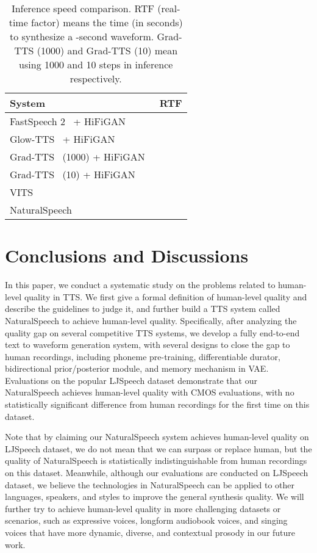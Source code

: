 \documentclass{article}
\theoremstyle{definition}
\def\myname{NaturalSpeech}
\begin{document}
\begin{table}[h!]
	\caption{Inference speed comparison. RTF (real-time factor) means the time (in seconds) to synthesize a -second waveform.  Grad-TTS (1000) and  Grad-TTS (10) mean using 1000 and 10 steps in inference respectively.}
	\centering
	\begin{tabular}{ l c}
		\toprule
	    System & RTF \\
	    \midrule
	    FastSpeech 2~\citep{ren2021fastspeech} + HiFiGAN~\citep{kong2020hifi}  &  \\
	    Glow-TTS~\citep{kim2020glow} + HiFiGAN~\citep{kong2020hifi} & \\
	    Grad-TTS~\citep{popov2021grad} (1000) + HiFiGAN~\citep{kong2020hifi} & \\
	    Grad-TTS~\citep{popov2021grad} (10) + HiFiGAN~\citep{kong2020hifi} & \\
	    VITS~\citep{kim2021conditional} & \\
	    \midrule
		\myname{}  &  \\
		\bottomrule
	\end{tabular}
	\label{tab_exp_latency}
\end{table}




\section{Conclusions and Discussions}
In this paper, we conduct a systematic study on the problems related to human-level quality in TTS. We first give a formal definition of human-level quality and describe the guidelines to judge it, and further build a TTS system called \myname{} to achieve human-level quality. Specifically, after analyzing the quality gap on several competitive TTS systems, we develop a fully end-to-end text to waveform generation system, with several designs to close the gap to human recordings, including phoneme pre-training, differentiable durator, bidirectional prior/posterior module, and memory mechanism in VAE. Evaluations on the popular LJSpeech dataset demonstrate that our \myname{} achieves human-level quality with CMOS evaluations, with no statistically significant difference from human recordings for the first time on this dataset. 

Note that by claiming our \myname{} system achieves human-level quality on LJSpeech dataset, we do not mean that we can surpass or replace human, but the quality of \myname{} is statistically indistinguishable from human recordings on this dataset. Meanwhile, although our evaluations are conducted on LJSpeech dataset, we believe the technologies in \myname{} can be applied to other languages, speakers, and styles to improve the general synthesis quality. We will further try to achieve human-level quality in more challenging datasets or scenarios, such as expressive voices, longform audiobook voices, and singing voices that have more dynamic, diverse, and contextual prosody in our future work. 
\end{document}
